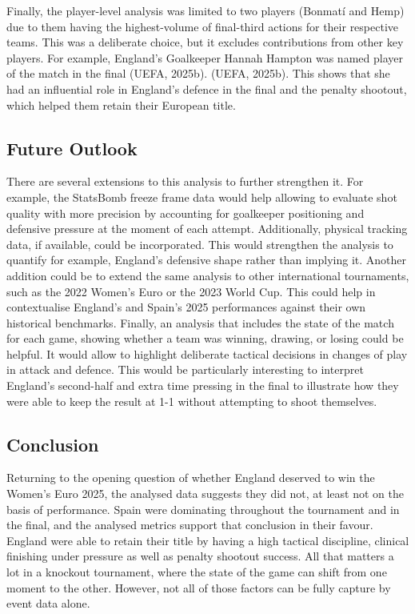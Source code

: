 \documentclass[
  11pt,
  a4paper,
  DIV=11,
  numbers=noendperiod]{scrartcl}
\begin{document}
Finally, the player-level analysis was limited to two players (Bonmatí
and Hemp) due to them having the highest-volume of final-third actions
for their respective teams. This was a deliberate choice, but it
excludes contributions from other key players. For example, England's
Goalkeeper Hannah Hampton was named player of the match in the final
(UEFA, 2025b). (UEFA, 2025b). This shows that she had an influential
role in England's defence in the final and the penalty shootout, which
helped them retain their European title.

\subsection{Future Outlook}\label{future-outlook}

There are several extensions to this analysis to further strengthen it.
For example, the StatsBomb freeze frame data would help allowing to
evaluate shot quality with more precision by accounting for goalkeeper
positioning and defensive pressure at the moment of each attempt.
Additionally, physical tracking data, if available, could be
incorporated. This would strengthen the analysis to quantify for
example, England's defensive shape rather than implying it. Another
addition could be to extend the same analysis to other international
tournaments, such as the 2022 Women's Euro or the 2023 World Cup. This
could help in contextualise England's and Spain's 2025 performances
against their own historical benchmarks. Finally, an analysis that
includes the state of the match for each game, showing whether a team
was winning, drawing, or losing could be helpful. It would allow to
highlight deliberate tactical decisions in changes of play in attack and
defence. This would be particularly interesting to interpret England's
second-half and extra time pressing in the final to illustrate how they
were able to keep the result at 1-1 without attempting to shoot
themselves.

\subsection{Conclusion}\label{conclusion}

Returning to the opening question of whether England deserved to win the
Women's Euro 2025, the analysed data suggests they did not, at least not
on the basis of performance. Spain were dominating throughout the
tournament and in the final, and the analysed metrics support that
conclusion in their favour. England were able to retain their title by
having a high tactical discipline, clinical finishing under pressure as
well as penalty shootout success. All that matters a lot in a knockout
tournament, where the state of the game can shift from one moment to the
other. However, not all of those factors can be fully capture by event
data alone.
\end{document}
